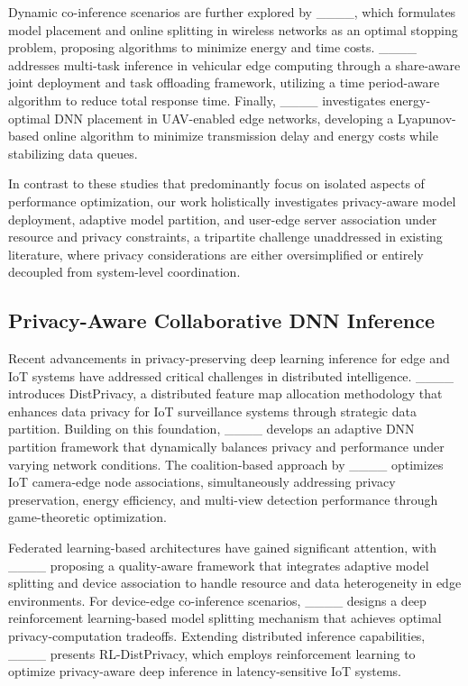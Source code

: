 Dynamic co-inference scenarios are further explored by ____, which formulates model placement and online splitting in wireless networks as an optimal stopping problem, proposing algorithms to minimize energy and time costs. ____ addresses multi-task inference in vehicular edge computing through a share-aware joint deployment and task offloading framework, utilizing a time period-aware algorithm to reduce total response time. Finally, ____ investigates energy-optimal DNN placement in UAV-enabled edge networks, developing a Lyapunov-based online algorithm to minimize transmission delay and energy costs while stabilizing data queues.

In contrast to these studies that predominantly focus on isolated aspects of performance optimization, our work holistically investigates privacy-aware model deployment, adaptive model partition, and user-edge server association under resource and privacy constraints, a tripartite challenge unaddressed in existing literature, where privacy considerations are either oversimplified or entirely decoupled from system-level coordination.

\subsection{Privacy-Aware Collaborative DNN Inference}
Recent advancements in privacy-preserving deep learning inference for edge and IoT systems have addressed critical challenges in distributed intelligence. ____ introduces DistPrivacy, a distributed feature map allocation methodology that enhances data privacy for IoT surveillance systems through strategic data partition. Building on this foundation, ____ develops an adaptive DNN partition framework that dynamically balances privacy and performance under varying network conditions. The coalition-based approach by ____ optimizes IoT camera-edge node associations, simultaneously addressing privacy preservation, energy efficiency, and multi-view detection performance through game-theoretic optimization.

Federated learning-based architectures have gained significant attention, with ____ proposing a quality-aware framework that integrates adaptive model splitting and device association to handle resource and data heterogeneity in edge environments. For device-edge co-inference scenarios, ____ designs a deep reinforcement learning-based model splitting mechanism that achieves optimal privacy-computation tradeoffs. Extending distributed inference capabilities, ____ presents RL-DistPrivacy, which employs reinforcement learning to optimize privacy-aware deep inference in latency-sensitive IoT systems.

